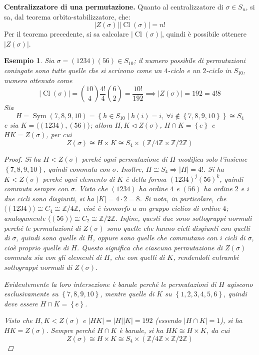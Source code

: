 \documentclass[12pt]{scrartcl}
\theoremstyle{style}
\newtheorem{esempio}{Esempio}[section]
\numberwithin{equation}{subsection}
\begin{document}
\textbf{Centralizzatore di una permutazione.} Quanto al centralizzatore di $\sigma \in S_n$, si sa, dal teorema orbita-stabilizzatore, che:
\begin{equation}
\lvert Z(\sigma ) \rvert \lvert \operatorname{Cl} (\sigma ) \rvert = n!
\end{equation}
Per il teorema precedente, si sa calcolare $\lvert \operatorname{Cl} (\sigma ) \rvert $, quindi \`e possibile ottenere $\lvert Z(\sigma ) \rvert $.
\begin{esempio}
Sia $\sigma = (1234)(56) \in S_{10}$; il numero possibile di permutazioni coniugate sono tutte quelle che si scrivono come un $4$-ciclo e un $2$-ciclo in $S_{10}$, numero ottenuto come
\[
	\lvert \operatorname{Cl} (\sigma ) \rvert  = \binom{10}{4}\frac{4!}{4} \binom{6}{2}= \frac{10!}{192}\implies \lvert Z(\sigma ) \rvert = 192 = 4! 8
\] 
Sia
\[
H = \operatorname{Sym} \left(7,8,9,10\right) =\left\{ h \in S_{10}  \mid h(i) = i, \ \forall i \not \in \left\{ 7,8,9,10 \right\}  \right\} \cong S_4
\] 
e sia $K = \langle (1234),(56) \rangle$; allora $H,K \lhd Z(\sigma )$, $H\cap K = \left\{ e \right\} $ e $HK=Z(\sigma )$, per cui
\[
Z(\sigma ) \cong H \times K \cong S_4 \times (\mathbb{Z}/4\mathbb{Z} \times \mathbb{Z}/2\mathbb{Z})
\] 
\begin{proof}
	Si ha $H <Z(\sigma )$ perch\'e ogni permutazione di $H$ modifica solo l'insieme $\left\{ 7,8,9,10 \right\} $, quindi commuta con $\sigma $. Inoltre, $H \cong S_4 \Rightarrow \lvert H \rvert  = 4!$.
	Si ha $K<Z(\sigma )$ perch\'e ogni elemento di $K$ \`e della forma $(1234)^j(56)^k$, quindi commuta sempre con $\sigma $.
	Visto che $(1234)$ ha ordine $4$ e $(56)$ ha ordine $2$ e i due cicli sono disgiunti, si ha $\lvert K \rvert = 4 \cdot 2=8$.
	Si nota, in particolare, che $\langle (1234) \rangle\cong C_4\cong\mathbb{Z}/4\mathbb{Z}$, cio\`e \`e isomorfo a un gruppo ciclico di ordine $4$; analogamente $\langle (56) \rangle\cong C_2\cong\mathbb{Z}/2\mathbb{Z}$.
	Infine, questi due sono sottogruppi normali perch\'e le permutazioni di $Z(\sigma )$ sono quelle che hanno cicli disgiunti con quelli di $\sigma $, quindi sono quelle di $H$, oppure sono quelle che commutano con i cicli di $\sigma $, cio\`e proprio quelle di $H$.
	Questo significa che ciascuna permutazione di $Z(\sigma )$ commuta sia con gli elementi di $H$, che con quelli di $K$, rendendoli entrambi sottogruppi normali di $Z(\sigma )$.

	Evidentemente la loro intersezione \`e banale perch\'e le permutazioni di $H$ agiscono esclusivamente su $\left\{ 7,8,9,10 \right\} $, mentre quelle di $K$ su $\left\{ 1,2,3,4,5,6 \right\} $, quindi deve essere $H\cap K = \left\{ e \right\} $.

	Visto che $H,K < Z(\sigma )$ e $\lvert HK \rvert = \lvert H \rvert \lvert K \rvert =192 $ (essendo $\lvert H\cap K \rvert = 1$), si ha $HK = Z(\sigma )$.
	Sempre perch\'e $H\cap K$ \`e banale, si ha $HK \cong H \times K$, da cui
	\[
	Z(\sigma ) \cong H \times K \cong S_4 \times (\mathbb{Z}/4\mathbb{Z} \times  \mathbb{Z}/2\mathbb{Z})
	\] 
\end{proof}
\end{esempio}
\end{document}

